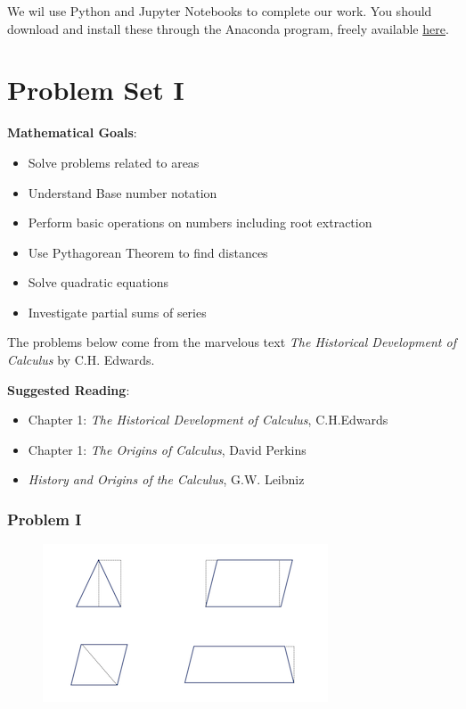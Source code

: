\documentclass[11pt]{article}
\makeatletter
\def\maxwidth{\ifdim\Gin@nat@width>\linewidth\linewidth
    \else\Gin@nat@width\fi}
\let\Oldincludegraphics\includegraphics
\renewcommand{\includegraphics}[1]{\Oldincludegraphics[width=.8\maxwidth]{#1}}
\providecommand{\tightlist}{%
      \setlength{\itemsep}{0pt}\setlength{\parskip}{0pt}}
\makeatother
\begin{document}
We wil use Python and Jupyter Notebooks to complete our work. You should
download and install these through the Anaconda program, freely
available \href{https://www.anaconda.com/download/\#macos}{here}.

    \section{Problem Set I}\label{problem-set-i}
\label{sec:02-problemsetI}
    \textbf{Mathematical Goals}:

\begin{itemize}
\tightlist
\item
  Solve problems related to areas
\item
  Understand Base number notation
\item
  Perform basic operations on numbers including root extraction
\item
  Use Pythagorean Theorem to find distances
\item
  Solve quadratic equations
\item
  Investigate partial sums of series
\end{itemize}

The problems below come from the marvelous text \emph{The Historical
Development of Calculus} by C.H. Edwards.

\textbf{Suggested Reading}:

\begin{itemize}
\tightlist
\item
  Chapter 1: \emph{The Historical Development of Calculus}, C.H.Edwards
\item
  Chapter 1: \emph{The Origins of Calculus}, David Perkins
\item
  \emph{History and Origins of the Calculus}, G.W. Leibniz
\end{itemize}

    \subsubsection{Problem I}\label{problem-i}

\begin{figure}
\centering
\includegraphics{images/section_I/p1.png}
\caption{}
\end{figure}
\end{document}
